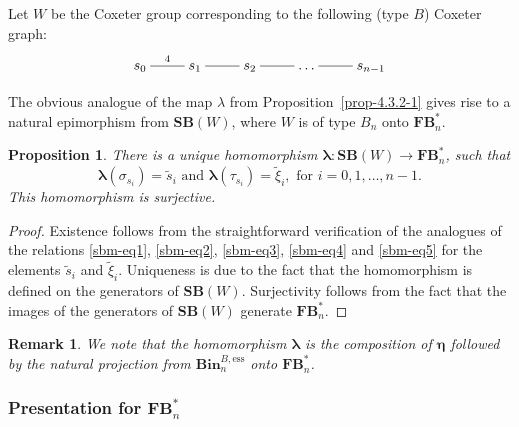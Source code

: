 \documentclass[a4paper]{amsart}
\newtheorem{proposition}[theorem]{Proposition}
\newtheorem{remark}[theorem]{Remark}
\begin{document}
Let $W$ be the Coxeter group corresponding to the following (type $B$) Coxeter graph:
\begin{displaymath}
\xymatrix{s_0\ar@{-}[r]^4&s_1\ar@{-}[r]&s_2\ar@{-}[r]&\dots\ar@{-}[r]&s_{n-1}} 
\end{displaymath}

The obvious analogue of the map $\lambda$ from Proposition~\ref{prop-4.3.2-1}
gives rise to a natural epimorphism from $\mathbf{SB}(W)$, where $W$ is of type $B_n$
onto $\mathbf{FB}^*_n$.

\begin{proposition}\label{prop-4.3.5-1}
There is a unique homomorphism $\boldsymbol{\lambda}:\mathbf{SB}(W)\to\mathbf{FB}^*_n$, such that
\begin{displaymath}
\boldsymbol{\lambda}(\sigma_{s_i})=\tilde{s}_i\text{ and }
\boldsymbol{\lambda}(\tau_{s_i})=\tilde{\xi}_{i},\text{ for }i=0,1,\dots,n-1.
\end{displaymath}
This homomorphism is surjective.
\end{proposition}

\begin{proof}
Existence follows from the straightforward verification of the analogues  of the relations 
\eqref{sbm-eq1}, \eqref{sbm-eq2}, \eqref{sbm-eq3}, \eqref{sbm-eq4} and \eqref{sbm-eq5} for the 
elements $\tilde{s}_i$  and $\tilde{\xi}_{i}$.  Uniqueness is due to the fact that the homomorphism
is defined on the generators of $\mathbf{SB}(W)$. Surjectivity follows from the fact that
the images of the generators of $\mathbf{SB}(W)$ generate $\mathbf{FB}^*_n$.
\end{proof}

\begin{remark}\label{rem13}
{\em 
We note that the homomorphism $\boldsymbol{\lambda}$ is the composition of 
$\boldsymbol{\eta}$ followed by the natural projection from 
$\mathbf{Bin}^{B,\mathrm{ess}}_n$ onto $\mathbf{FB}^*_n$.
}
\end{remark}

\subsubsection{Presentation for $\mathbf{FB}^*_n$}\label{s4.3.7}
\end{document}
